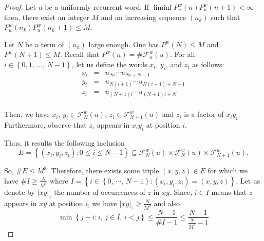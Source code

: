 \documentclass[10pt,a4paper]{amsart}
\begin{document}
\begin{proof}
Let $u$ be a uniformly recurrent word. If $\liminf P^{w}_{u}(n) P^{w}_{u}(n+1) <\infty$ then,  there exist an integer $M$ and an  increasing sequence $(n_k)$ such that $ P^{w}_{u}(n_{k}) P^{w}_{u}(n_{k}+1) \leq M$. %




Let  $N$ be a term of   $(n_k)$ large enough. One has $P^w(N)\leq M$ and $P^w(N+1)\leq M$. Recall that  $P^w(n)=\#\mathcal{F}^{w}_{n}(u)$. For all $i\in \left\{0,1, \, \ldots, \, N-1\right\}$, let us define the words $x_i$, $y_i$, and $z_i$ as follows:
$$\begin{array}{lcl}

x_i&=&u_{Ni}\cdots u_{Ni+N-1}\\
y_i&=&u_{N\left(i+1\right)}\cdots u_{N\left(i+1\right)+N-1}\\
z_i&=&u_{\left(N+1\right)i}\cdots u_{\left(N+1\right)i+N}\\

\end{array}$$

Then, we have $ x_i,\, y_i\in \mathcal{F}^{w}_{N}\left(u\right)$, $ z_i\in \mathcal{F}^{w}_{N+1}\left(u\right) $ and $z_i$ is a factor of $x_iy_i$. Furthermore, observe that $z_i$ appears in $x_iy_i$ at position $i$.


Thus, it results the following inclusion
$$E=\left\lbrace\left(x_i,y_i, z_i\right):  0\leq i\leq N-1\right\rbrace \subseteq\mathcal{F}_{N}^{w}(u)\times \mathcal{F}_{N}^{w}(u)\times \mathcal{F}_{N+1}^{w}(u).$$


So, $\# E \leq M^3$. Therefore, there exists some triple $(x, y, z)\in E$  for which we have $\# I\geq \frac{N}{M^{3}}$ where $I=\left\lbrace i\in \left\lbrace 0,\, \cdots,\, N-1\right\rbrace : \left( x_i,y_i,z_i\right) =\left( x,y,z\right)  \right\rbrace $. Let us denote by  $|xy|_z$ the number of occurrences of $z$ in $xy$. Since,  $i\in I$  means that $z$ appears in $xy$ at position $i$, we have $|xy|_z\geq \frac{N}{M^3}$ and also
$$\min\left\{j-i: i,\, j\in I, \, i<j\right\}\leq \frac{N-1}{\#I-1}\leq \frac{N-1}{\frac{N}{M^3}-1}$$ 


\end{proof}
\end{document}
